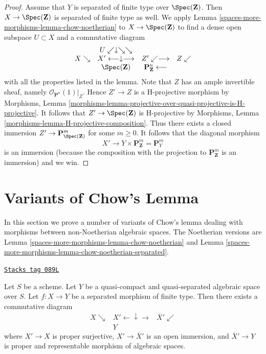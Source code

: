 \begin{proof}
\medskip\noindent
Assume that $Y$ is separated of finite type over $\Spec(\mathbf{Z})$.
Then $X \to \Spec(\mathbf{Z})$ is separated of finite type as well.
We apply Lemma \ref{spaces-more-morphisms-lemma-chow-noetherian} to $X \to \Spec(\mathbf{Z})$
to find a dense open subspace $U \subset X$ and a commutative diagram
$$
\begin{array}{cccc} & U \swarrow\downarrow\searrow\searrow &  &  \\ X \searrow & X' \longleftarrow\downarrow\longrightarrow & Z' \swarrow\longrightarrow & Z \swarrow \\  & \Spec(\mathbf{Z}) & \mathbf{P}^n_\mathbf{Z} \longleftarrow & \end{array}
$$
with all the properties listed in the lemma.
Note that $Z$ has an ample invertible sheaf, namely
$\mathcal{O}_{\mathbf{P}^n}(1)|_Z$. Hence $Z' \to Z$
is a H-projective morphism by Morphisms, Lemma
\ref{morphisms-lemma-projective-over-quasi-projective-is-H-projective}.
It follows that $Z' \to \Spec(\mathbf{Z})$ is H-projective
by Morphisms, Lemma \ref{morphisms-lemma-H-projective-composition}.
Thus there exists a closed immersion
$Z' \to \mathbf{P}^m_{\Spec(\mathbf{Z})}$ for some $m \geq 0$.
It follows that the diagonal morphism
$$
X' \to Y \times \mathbf{P}^m_\mathbf{Z} = \mathbf{P}^m_Y
$$
is an immersion (because the composition with the projection
to $\mathbf{P}^m_\mathbf{Z}$ is an immersion) and we win.
\end{proof}

\section{Variants of Chow's Lemma}
\label{spaces-more-morphisms-section-chows-lemma}
In this section we prove a number of variants of Chow's lemma dealing
with morphisms between non-Noetherian algebraic spaces.
The Noetherian versions are
Lemma \ref{spaces-more-morphisms-lemma-chow-noetherian}
and
Lemma \ref{spaces-more-morphisms-lemma-chow-noetherian-separated}.

\begin{lemma}
\label{spaces-more-morphisms-lemma-chow-finite-type}
\href{https://stacks.math.columbia.edu/tag/089L}{\texttt{Stacks tag 089L}}

Let $S$ be a  scheme. Let $Y$ be a quasi-compact and quasi-separated
algebraic space over $S$. Let $f : X \to Y$ be a separated morphism of
finite type. Then there exists a commutative diagram
$$
\begin{array}{ccc}X \searrow & X' \longleftarrow\downarrow\longrightarrow & \overline{X}' \swarrow \\  & Y & \end{array}
$$
where $X' \to X$ is proper surjective,
$X' \to \overline{X}'$ is an open immersion, and
$\overline{X}' \to Y$ is proper and representable morphism
of algebraic spaces.
\end{lemma}


